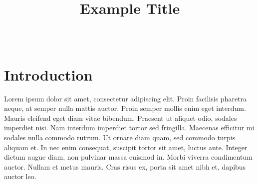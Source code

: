 \documentclass[PM]{spherex}
\title{Example Title}
\author{
  \person[email=galileo@example.com]{Galileo~Galilei} \\
  \person{Isaac~Newton}
}
\begin{document}
\maketitle


\section{Introduction}\label{introduction}

Lorem ipsum dolor sit amet, consectetur adipiscing elit. Proin facilisis pharetra neque, at semper nulla mattis auctor. Proin semper mollis enim eget interdum. Mauris eleifend eget diam vitae bibendum. Praesent ut aliquet odio, sodales imperdiet nisi. Nam interdum imperdiet tortor sed fringilla. Maecenas efficitur mi sodales nulla commodo rutrum. Ut ornare diam quam, sed commodo turpis aliquam et. In nec enim consequat, suscipit tortor sit amet, luctus ante. Integer dictum augue diam, non pulvinar massa euismod in. Morbi viverra condimentum auctor. Nullam et metus mauris. Cras risus ex, porta sit amet nibh et, dapibus auctor leo.


\end{document}
